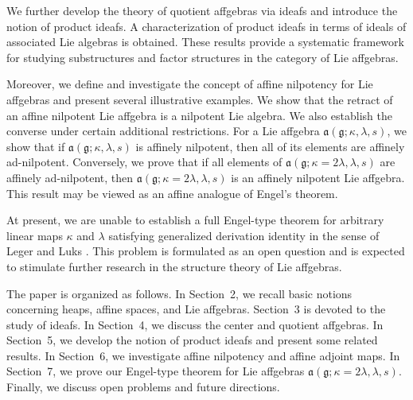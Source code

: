 \documentclass{article}
\theoremstyle{definition}
\theoremstyle{remark}
\theoremstyle{plain}
\begin{document}
We further develop the theory of quotient affgebras via ideafs and introduce the notion of product ideafs. A characterization of product ideafs in terms of ideals of associated Lie algebras is obtained. These results provide a systematic framework for studying substructures and factor structures in the category of Lie affgebras.

Moreover, we define and investigate the concept of affine nilpotency for Lie affgebras and present several illustrative examples. We show that the retract of an affine nilpotent Lie affgebra is a nilpotent Lie algebra. We also establish the converse under certain additional restrictions.
 For a Lie affgebra $\mathfrak{a}(\mathfrak{g}; \kappa, \lambda, s)$, we show that if $\mathfrak{a}(\mathfrak{g}; \kappa, \lambda, s)$ is affinely nilpotent, then all of its elements are affinely ad-nilpotent. Conversely, we prove that if all elements of $\mathfrak{a}(\mathfrak{g}; \kappa=2\lambda, \lambda, s)$ are affinely ad-nilpotent, then $\mathfrak{a}(\mathfrak{g}; \kappa=2\lambda, \lambda, s)$ is an affinely nilpotent Lie affgebra. This result may be viewed as an affine analogue of Engel’s theorem.

At present, we are unable to establish a full Engel-type theorem for arbitrary linear maps $\kappa$ and $\lambda$ satisfying generalized derivation identity in the sense of Leger and Luks \cite{Leg1}. This problem is formulated as an open question and is expected to stimulate further research in the structure theory of Lie affgebras.

The paper is organized as follows. In Section~2, we recall basic notions concerning heaps, affine spaces, and Lie affgebras. Section~3 is devoted to the study of ideafs. In Section~4, we discuss the center and quotient affgebras. In Section~5, we develop the notion of product ideafs and present some related results. In Section~6, we investigate affine nilpotency and affine adjoint maps. In Section~7, we prove our Engel-type theorem for Lie affgebras $\mathfrak{a}(\mathfrak{g}; \kappa=2\lambda, \lambda, s)$. Finally, we discuss open problems and future directions.
\end{document}
